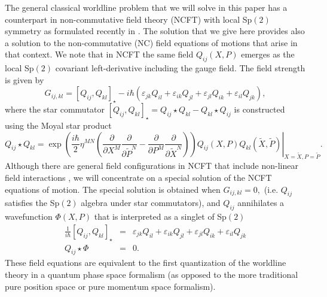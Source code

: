 \documentclass[a4paper,12pt]{article}
\begin{document}
The general classical worldline problem that we will solve in this paper has
a counterpart in non-commutative field theory (NCFT) with local Sp$\left(
2\right) $ symmetry as formulated recently in \cite{ncsp}. The solution that
we give here provides also a solution to the non-commutative (NC) field
equations of motions that arise in that context. We note that in NCFT the
same field $Q_{ij}\left( X,P\right) $ emerges as the local Sp$\left(
2\right) $ covariant left-derivative including the gauge field. The field
strength is given by
\begin{equation}
G_{ij,kl}=\left[ Q_{ij},Q_{kl}\right] _{\star }-i\hbar \left( \varepsilon
_{jk}Q_{il}+\varepsilon _{ik}Q_{jl}+\varepsilon _{jl}Q_{ik}+\varepsilon
_{il}Q_{jk}\right) ,  \label{fijkl}
\end{equation}
where the star commutator $\left[ Q_{ij},Q_{kl}\right] _{\star }=Q_{ij}\star
Q_{kl}-Q_{kl}\star Q_{ij}$ is constructed using the Moyal star product
\begin{equation}
Q_{ij}\star Q_{kl}=\left. \exp \left( \frac{i\hbar }{2}\eta ^{MN}\left(
\frac{\partial }{\partial X^{M}}\frac{\partial }{\partial \tilde{P}^{N}}-%
\frac{\partial }{\partial P^{M}}\frac{\partial }{\partial \tilde{X}^{N}}%
\right) \right) Q_{ij}\left( X,P\right) Q_{kl}\left( \tilde{X},\tilde{P}%
\right) \right| _{X=\tilde{X},P=\tilde{P}}.  \label{starpr}
\end{equation}
Although there are general field configurations in NCFT that include
non-linear field interactions \cite{ncsp}, we will concentrate on a special
solution of the NCFT equations of motion. The special solution is obtained
when $G_{ij,kl}=0,$ (i.e. $Q_{ij}$ satisfies the Sp$\left( 2\right) $
algebra under star commutators), and $Q_{ij}$ annihilates a wavefunction $%
\Phi \left( X,P\right) $ that is interpreted as a singlet of Sp$\left(
2\right) $%
\begin{eqnarray}
\frac{1}{i\hbar }\left[ Q_{ij},Q_{kl}\right] _{\star } &=&\varepsilon
_{jk}Q_{il}+\varepsilon _{ik}Q_{jl}+\varepsilon _{jl}Q_{ik}+\varepsilon
_{il}Q_{jk}  \label{ncft1} \\
Q_{ij}\star \Phi &=&0.  \label{ncft2}
\end{eqnarray}
These field equations are equivalent to the first quantization of the
worldline theory in a quantum phase space formalism (as opposed to the more
traditional pure position space or pure momentum space formalism).
\end{document}
